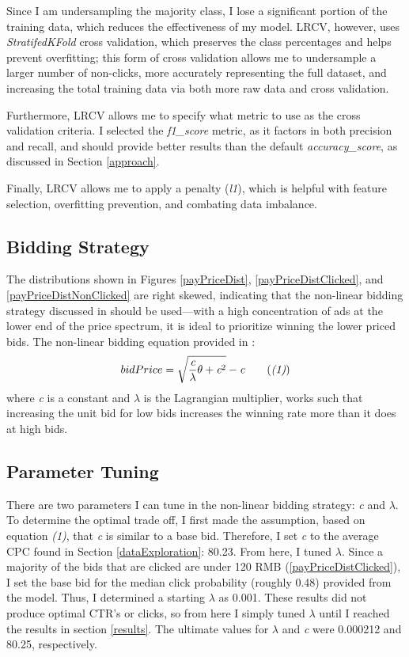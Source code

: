 \documentclass{sig-alternate-05-2015}
\begin{document}
Since I am undersampling the majority class, I lose a significant portion of the training data, which reduces the effectiveness of my model. LRCV, however, uses \textit{StratifedKFold} cross validation, which preserves the class percentages and helps prevent overfitting; this form of cross validation allows me to undersample a larger number of non-clicks, more accurately representing the full dataset, and increasing the total training data via both more raw data and cross validation.

Furthermore, LRCV allows me to specify what metric to use as the cross validation criteria. I selected the \textit{f1\_score} metric, as it factors in both precision and recall, and should provide better results than the default \textit{accuracy\_score}, as discussed in Section \ref{approach}.

Finally, LRCV allows me to apply a penalty (\textit{l1}), which is helpful with feature selection, overfitting prevention, and combating data imbalance.

\subsection{Bidding Strategy} \label{biddingStrategy}
The distributions shown in Figures \ref{payPriceDist}, \ref{payPriceDistClicked}, and \ref{payPriceDistNonClicked} are right skewed, indicating that the non-linear bidding strategy discussed in \cite{nonlinear} should be used---with a high concentration of ads at the lower end of the price spectrum, it is ideal to prioritize winning the lower priced bids.  The non-linear bidding equation provided in \cite{nonlinear}:
\begin{equation}
bidPrice = \sqrt{\frac{\textit{c}}{\lambda}\theta + \textit{c}^{2}} - \textit{c} \tag{\textit{(1)}}
\end{equation}
where \textit{c} is a constant and $\lambda$ is the Lagrangian multiplier, works such that increasing the unit bid for low bids increases the winning rate more than it does at high bids.

\subsection{Parameter Tuning}
There are two parameters I can tune in the non-linear bidding strategy: \textit{c} and $\lambda$.  To determine the optimal trade off, I first made the assumption, based on equation \textit{(1)}, that \textit{c} is similar to a base bid. Therefore, I set \textit{c} to the average CPC found in Section \ref{dataExploration}: 80.23.  From here, I tuned $\lambda$.  Since a majority of the bids that are clicked are under 120 RMB (\ref{payPriceDistClicked}), I set the base bid for the median click probability (roughly 0.48) provided from the model.  Thus, I determined a starting $\lambda$ as 0.001.  These results did not produce optimal CTR's or clicks, so from here I simply tuned $\lambda$ until I reached the results in section \ref{results}.  The ultimate values for $\lambda$ and \textit{c} were 0.000212 and 80.25, respectively.
\end{document}
